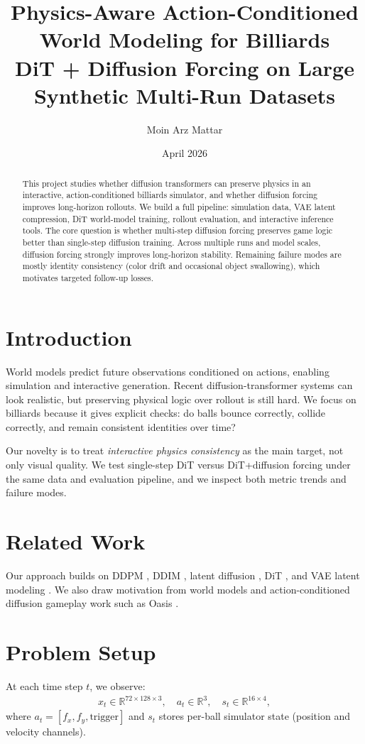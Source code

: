 \documentclass[11pt]{article}
\title{Physics-Aware Action-Conditioned World Modeling for Billiards\\
\large DiT + Diffusion Forcing on Large Synthetic Multi-Run Datasets}
\author{Moin Arz Mattar}
\date{April 2026}
\begin{document}
\maketitle
\doublespacing

\begin{abstract}
This project studies whether diffusion transformers can preserve physics in an interactive, action-conditioned billiards simulator, and whether diffusion forcing improves long-horizon rollouts. We build a full pipeline: simulation data, VAE latent compression, DiT world-model training, rollout evaluation, and interactive inference tools. The core question is whether multi-step diffusion forcing preserves game logic better than single-step diffusion training. Across multiple runs and model scales, diffusion forcing strongly improves long-horizon stability. Remaining failure modes are mostly identity consistency (color drift and occasional object swallowing), which motivates targeted follow-up losses.
\end{abstract}

\section{Introduction}
World models predict future observations conditioned on actions, enabling simulation and interactive generation. Recent diffusion-transformer systems can look realistic, but preserving physical logic over rollout is still hard. We focus on billiards because it gives explicit checks: do balls bounce correctly, collide correctly, and remain consistent identities over time?

Our novelty is to treat \textit{interactive physics consistency} as the main target, not only visual quality. We test single-step DiT versus DiT+diffusion forcing under the same data and evaluation pipeline, and we inspect both metric trends and failure modes.

\section{Related Work}
Our approach builds on DDPM \cite{ho2020ddpm}, DDIM \cite{song2021ddim}, latent diffusion \cite{rombach2022ldm}, DiT \cite{peebles2023dit}, and VAE latent modeling \cite{kingma2014vae}. We also draw motivation from world models \cite{ha2018worldmodels, hafner2023dreamerv3} and action-conditioned diffusion gameplay work such as Oasis \cite{oasisrepo, oasisblog}.

\section{Problem Setup}
At each time step $t$, we observe:
\begin{align}
x_t \in \mathbb{R}^{72\times 128\times 3},\quad
a_t \in \mathbb{R}^{3},\quad
s_t \in \mathbb{R}^{16\times 4},
\end{align}
where $a_t=[f_x,f_y,\text{trigger}]$ and $s_t$ stores per-ball simulator state (position and velocity channels).
\end{document}
